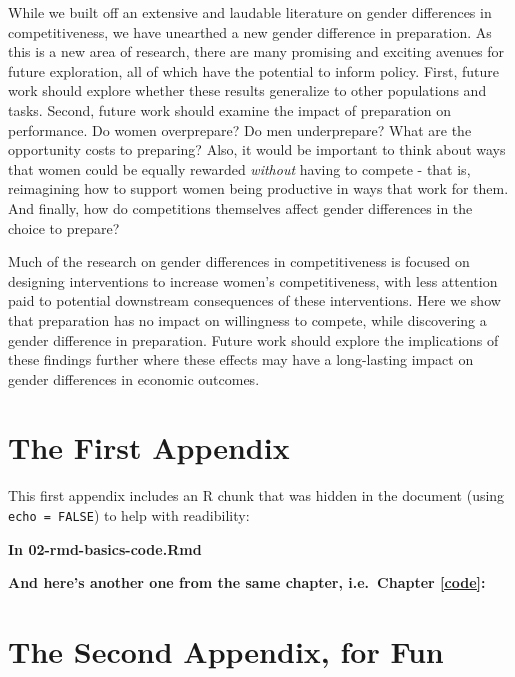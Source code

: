 \documentclass[a4paper, nobind]{templates/ociamthesis}
\newcommand*{\bibtitle}{Works Cited}
\begin{document}
While we built off an extensive and laudable literature on gender differences in competitiveness, we have unearthed a new gender difference in preparation. As this is a new area of research, there are many promising and exciting avenues for future exploration, all of which have the potential to inform policy. First, future work should explore whether these results generalize to other populations and tasks. Second, future work should examine the impact of preparation on performance. Do women overprepare? Do men underprepare? What are the opportunity costs to preparing? Also, it would be important to think about ways that women could be equally rewarded \emph{without} having to compete - that is, reimagining how to support women being productive in ways that work for them. And finally, how do competitions themselves affect gender differences in the choice to prepare?

Much of the research on gender differences in competitiveness is focused on designing interventions to increase women's competitiveness, with less attention paid to potential downstream consequences of these interventions. Here we show that preparation has no impact on willingness to compete, while discovering a gender difference in preparation. Future work should explore the implications of these findings further where these effects may have a long-lasting impact on gender differences in economic outcomes.

\startappendices

\hypertarget{the-first-appendix}{%
\chapter{The First Appendix}\label{the-first-appendix}}

This first appendix includes an R chunk that was hidden in the document (using \texttt{echo\ =\ FALSE}) to help with readibility:

\textbf{In 02-rmd-basics-code.Rmd}

\textbf{And here's another one from the same chapter, i.e.~Chapter \ref{code}:}

\hypertarget{the-second-appendix-for-fun}{%
\chapter{The Second Appendix, for Fun}\label{the-second-appendix-for-fun}}


\setlength{\baselineskip}{0pt} %

{\renewcommand*\MakeUppercase[1]{#1}%
\printbibliography[heading=bibintoc,title={\bibtitle}]}
\end{document}
